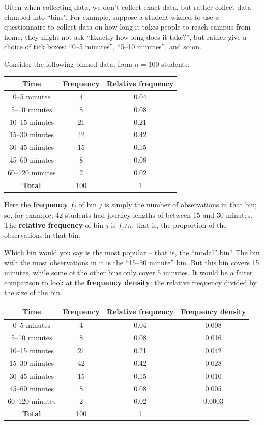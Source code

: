 \documentclass[
  a4paper,
]{book}
\theoremstyle{definition}
\theoremstyle{definition}
\theoremstyle{definition}
\theoremstyle{definition}
\theoremstyle{remark}
\begin{document}
Often when collecting data, we don't collect exact data, but rather collect data clumped into ``bins''. For example, suppose a student wished to use a questionnaire to collect data on how long it takes people to reach campus from home; they might not ask ``Exactly how long does it take?'', but rather give a choice of tick boxes: ``0--5 minutes'', ``5--10 minutes'', and so on.

Consider the following binned data, from \(n = 100\) students:

\begin{longtable}[]{@{}ccc@{}}
\toprule()
Time & Frequency & Relative frequency \\
\midrule()
\endhead
0--5 minutes & 4 & 0.04 \\
5--10 minutes & 8 & 0.08 \\
10--15 minutes & 21 & 0.21 \\
15--30 minutes & 42 & 0.42 \\
30--45 minutes & 15 & 0.15 \\
45--60 minutes & 8 & 0.08 \\
60--120 minutes & 2 & 0.02 \\
\textbf{Total} & 100 & 1 \\
\bottomrule()
\end{longtable}

Here the \textbf{frequency} \(f_j\) of bin \(j\) is simply the number of observations in that bin; so, for example, 42 students had journey lengths of between 15 and 30 minutes. The \textbf{relative frequency} of bin \(j\) is \(f_j/n\); that is, the proportion of the observations in that bin.

Which bin would you say is the most popular -- that is, the ``modal'' bin? The bin with the most observations in it is the ``15--30 minute'' bin. But this bin covers 15 minutes, while some of the other bins only cover 5 minutes. It would be a fairer comparison to look at the \textbf{frequency density}: the relative frequency divided by the size of the bin.

\begin{longtable}[]{@{}cccc@{}}
\toprule()
Time & Frequency & Relative frequency & Frequency density \\
\midrule()
\endhead
0--5 minutes & 4 & 0.04 & 0.008 \\
5--10 minutes & 8 & 0.08 & 0.016 \\
10--15 minutes & 21 & 0.21 & 0.042 \\
15--30 minutes & 42 & 0.42 & 0.028 \\
30--45 minutes & 15 & 0.15 & 0.010 \\
45--60 minutes & 8 & 0.08 & 0.005 \\
60--120 minutes & 2 & 0.02 & 0.0003 \\
\textbf{Total} & 100 & 1 & \\
\bottomrule()
\end{longtable}
\end{document}
